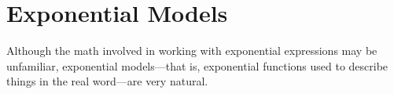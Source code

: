 \section{Exponential Models} 
Although the math involved in working with exponential expressions may be unfamiliar, exponential models---that is, exponential functions used to describe things in the real word---are very natural.

 
 


 


 
